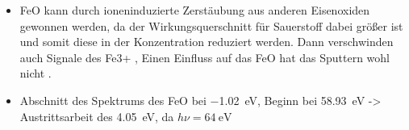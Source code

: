 \begin{itemize}
                \item FeO kann durch ioneninduzierte Zerstäubung aus anderen Eisenoxiden gewonnen werden, da der Wirkungsquerschnitt für Sauerstoff dabei größer ist und somit diese in der Konzentration reduziert werden. \cite{FeO_12}
                      Dann verschwinden auch Signale des Fe3+ \cite{FeO_15}, Einen Einfluss auf das FeO hat das Sputtern wohl nicht \cite{FeO_12, FeO_15}.
                \item Abschnitt des Spektrums des FeO bei \SI{-1.02}{\electronvolt}, Beginn bei \SI{58.93}{\electronvolt} -> Austrittsarbeit des  \SI{4.05}{\electronvolt}, da $h\nu = \SI{64}{\electronvolt}$
            \end{itemize}

